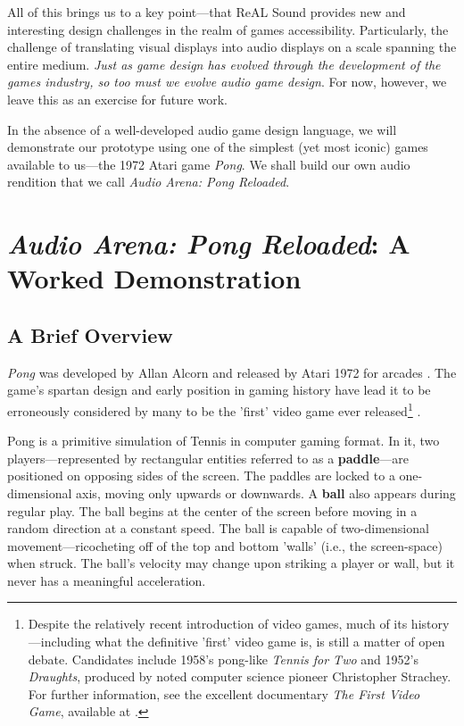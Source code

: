 \documentclass{report}
\newcommand{\rs}{ReAL Sound\xspace}
\newcommand{\tech}[1]{\textbf{#1}}
\begin{document}
All of this brings us to a key point---that \rs provides new and interesting design challenges in the realm of games accessibility. Particularly, the challenge of translating visual displays into audio displays on a scale spanning the entire medium. \emph{Just as game design has evolved through the development of the games industry, so too must we evolve audio game design}. For now, however, we leave this as an exercise for future work.

In the absence of a well-developed audio game design language, we will demonstrate our prototype using one of the simplest (yet most iconic) games available to us---the 1972 Atari game \emph{Pong}. We shall build our own audio rendition that we call \emph{Audio Arena: Pong Reloaded}.

\section{\emph{Audio Arena: Pong Reloaded}: A Worked Demonstration}
\subsection{A Brief Overview}
\emph{Pong} was developed by Allan Alcorn and released by Atari 1972 for arcades \cite{o2015pillars}. The game's spartan design and early position in gaming history have lead it to be erroneously considered by many to be the 'first' video game ever released\footnote{Despite the relatively recent introduction of video games, much of its history---including what the definitive 'first' video game is, is still a matter of open debate. Candidates include 1958's pong-like \emph{Tennis for Two} \cite{de2015tennis} and 1952's \emph{Draughts}, produced by noted computer science pioneer Christopher Strachey. For further information, see the excellent documentary \emph{The First Video Game}, available at \cite{Ahoy_2019}.} \cite{raessens2011handbook}. 

Pong is a primitive simulation of Tennis in computer gaming format. In it, two players---represented by rectangular entities referred to as a \tech{paddle}---are positioned on opposing sides of the screen. The paddles are locked to a one-dimensional axis, moving only upwards or downwards. A \tech{ball} also appears during regular play. The ball begins at the center of the screen before moving in a random direction at a constant speed. The ball is capable of two-dimensional movement---ricocheting off of the top and bottom 'walls' (i.e., the screen-space) when struck. The ball's velocity may change upon striking a player or wall, but it never has a meaningful acceleration.
\end{document}
